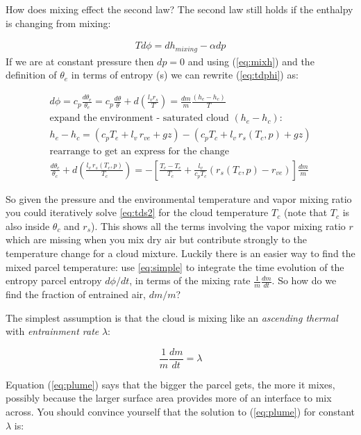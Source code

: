 \documentclass[12pt]{article}
\begin{document}
How does mixing effect the second law?  The second
law still holds if the enthalpy is changing from mixing:


\begin{gather}
  T d\phi  =  dh_{mixing} - \alpha dp
\label{eq:tdphi}
\end{gather}
If we are at constant pressure then $dp=0$ and using
(\ref{eq:mixh}) and the definition of $\theta_e$ in terms of entropy (s)
we can rewrite (\ref{eq:tdphi}) as:

\begin{gather}
   d\phi = c_p \frac{d \theta_e }{\theta_e} = c_p \frac{ d\theta}{\theta}
   + d \left ( \frac{l_v r_s}{T} \right ) =  \frac{ dm}{m} \frac{ (h_e - h_c)}{T}\label{eq:simple}\\
\text{expand the environment - saturated cloud $(h_e - h_c)$: }\nonumber \\
h_e - h_c =  (c_p T_e + l_v\, r_{ve} + g z) - (c_p T_c + l_v\, r_s(T_c,p) + g z)\\
\text{rearrange to get  an express for the change }\\
  \frac{d\theta_c}{\theta_c} + d \left ( \frac{l_v\,r_s(T_c,p)}{T_c} \right ) = 
  - \left [ \frac{T_c - T_e}{T_c} + \frac{l_v}{c_p T_c} (r_s(T_c,p) - r_{ve}) \right ]
   \frac{dm}{m}
\label{eq:tds2}
\end{gather}

So given the pressure and the environmental temperature and vapor mixing ratio you could
iteratively solve \eqref{eq:tds2} for the cloud temperature $T_c$ (note that $T_c$ is also
inside $\theta_c$ and $r_s$).   This shows all the terms involving the vapor mixing ratio $r$ which
are missing when you mix dry air but contribute strongly to the temperature change for 
a cloud mixture.  Luckily there is an easier way to find the mixed parcel temperature: use \eqref{eq:simple}  to 
integrate the time evolution of the entropy parcel entropy $d\phi/dt$, in terms of the mixing rate $\frac{1}{m}\frac{dm}{dt}$. 
So how do we find the fraction of entrained air, $dm/m$?

The simplest assumption is  that the cloud is mixing
like an \textit{ascending thermal} with \textit{entrainment rate}
$\lambda$:

\begin{equation}
  \label{eq:plume}
  \frac{1}{m} \frac{dm}{dt} = \lambda
\end{equation}

Equation (\ref{eq:plume}) says that the bigger the parcel gets, the
more it mixes, possibly because the larger surface area provides more
of an interface to mix across.  You should convince yourself that
the solution to (\ref{eq:plume}) for constant $\lambda$ is:
\end{document}
